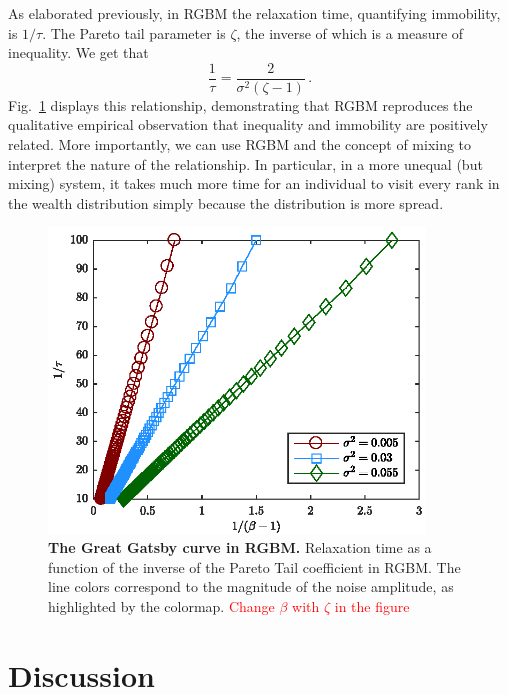\documentclass[11pt]{article}
\newcommand{\fref}[1]{Fig.~\ref{fig:#1}}
\newcommand{\be}{\begin{equation}}
\newcommand{\ee}{\end{equation}}
\numberwithin{equation}{section}
\begin{document}
As elaborated previously, in RGBM the relaxation time, quantifying immobility, is $1/\tau$. The Pareto tail parameter is $\zeta$, the inverse of which is a measure of inequality. We get that
%
\be
\frac{1}{\tau} = \frac{2}{\sigma^2\left(\zeta - 1\right)}\,.
\ee
%
\fref{rgbm-great-gatsby} displays this relationship, demonstrating that RGBM reproduces the qualitative empirical observation that inequality and immobility are positively related. More importantly, we can use RGBM and the concept of mixing to interpret the nature of the relationship. In particular, in a more unequal (but mixing) system, it takes much more time for an individual to visit every rank in the wealth distribution simply because the distribution is more spread. 

\begin{figure}[!htb]
\centering
\includegraphics[width=10cm]{figs/fig_great_gatsby.eps}
\caption{\textbf{The Great Gatsby curve in RGBM.} Relaxation time as a function of the inverse of the Pareto Tail coefficient in RGBM. The line colors correspond to the magnitude of the noise amplitude, as highlighted by the colormap. \textcolor{red}{Change $\beta$ with $\zeta$ in the figure}
\label{fig:rgbm-great-gatsby}}
\end{figure}

\FloatBarrier

\section{Discussion} \label{sec:discussion}
\end{document}
